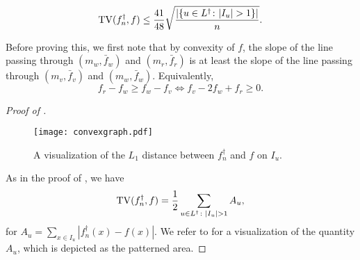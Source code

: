 \begin{prop}
  \[
    \operatorname{TV}(f_n^\dagger, f) \le \frac{41}{48} \sqrt{\frac{|\{u \in L^\dagger \colon |I_u| > 1\}|}{n} } .
  \]
\end{prop}
Before proving this, we first note that by convexity of $f$, the slope
of the line passing through $(m_w, \bar{f}_w)$ and $(m_r, \bar{f}_r)$
is at least the slope of the line passing through $(m_v, \bar{f}_v)$
and $(m_w, \bar{f}_w)$. Equivalently,
\[
  f_r - f_w \ge f_w - f_v \iff f_v - 2 f_w + f_r \ge 0 .
\]
\begin{proof}[Proof of ]
  \begin{figure} 
    \centering
    \texttt{[image: convexgraph.pdf]}
    \caption{A visualization of the $L_1$ distance between $f^\dagger_n$ and
      $f$ on $I_u$.}
  \end{figure}  
  As in the proof of , we have
  \[
    \operatorname{TV}(f_n^\dagger, f) = \frac{1}{2} \sum_{u \in L^\dagger \colon |I_u| > 1} A_u ,
  \]
  for $A_u = \sum_{x \in I_u} |f_n^\dagger(x) - f(x)|$. We refer to
   for a visualization of the quantity $A_u$, which
  is depicted as the patterned area.



\end{proof}
